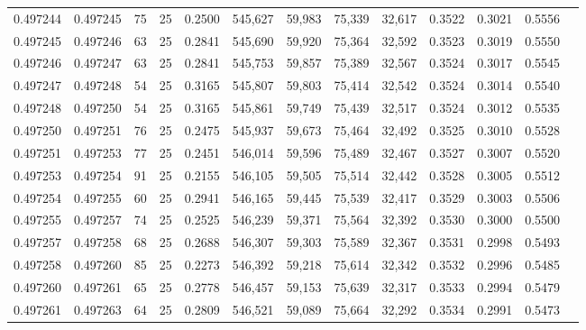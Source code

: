 \begin{tabular}{rrrrrrrrrrrrr}
0.497244 & 0.497245 &    75 &  25 &                                     0.2500 & 545,627 &  59,983 &  75,339 &  32,617 & 0.3522 & 0.3021 & 0.5556 \\
0.497245 & 0.497246 &    63 &  25 &                                     0.2841 & 545,690 &  59,920 &  75,364 &  32,592 & 0.3523 & 0.3019 & 0.5550 \\
0.497246 & 0.497247 &    63 &  25 &                                     0.2841 & 545,753 &  59,857 &  75,389 &  32,567 & 0.3524 & 0.3017 & 0.5545 \\
0.497247 & 0.497248 &    54 &  25 &                                     0.3165 & 545,807 &  59,803 &  75,414 &  32,542 & 0.3524 & 0.3014 & 0.5540 \\
0.497248 & 0.497250 &    54 &  25 &                                     0.3165 & 545,861 &  59,749 &  75,439 &  32,517 & 0.3524 & 0.3012 & 0.5535 \\
0.497250 & 0.497251 &    76 &  25 &                                     0.2475 & 545,937 &  59,673 &  75,464 &  32,492 & 0.3525 & 0.3010 & 0.5528 \\
0.497251 & 0.497253 &    77 &  25 &                                     0.2451 & 546,014 &  59,596 &  75,489 &  32,467 & 0.3527 & 0.3007 & 0.5520 \\
0.497253 & 0.497254 &    91 &  25 &                                     0.2155 & 546,105 &  59,505 &  75,514 &  32,442 & 0.3528 & 0.3005 & 0.5512 \\
0.497254 & 0.497255 &    60 &  25 &                                     0.2941 & 546,165 &  59,445 &  75,539 &  32,417 & 0.3529 & 0.3003 & 0.5506 \\
0.497255 & 0.497257 &    74 &  25 &                                     0.2525 & 546,239 &  59,371 &  75,564 &  32,392 & 0.3530 & 0.3000 & 0.5500 \\
0.497257 & 0.497258 &    68 &  25 &                                     0.2688 & 546,307 &  59,303 &  75,589 &  32,367 & 0.3531 & 0.2998 & 0.5493 \\
0.497258 & 0.497260 &    85 &  25 &                                     0.2273 & 546,392 &  59,218 &  75,614 &  32,342 & 0.3532 & 0.2996 & 0.5485 \\
0.497260 & 0.497261 &    65 &  25 &                                     0.2778 & 546,457 &  59,153 &  75,639 &  32,317 & 0.3533 & 0.2994 & 0.5479 \\
0.497261 & 0.497263 &    64 &  25 &                                     0.2809 & 546,521 &  59,089 &  75,664 &  32,292 & 0.3534 & 0.2991 & 0.5473 \\

\end{tabular}
